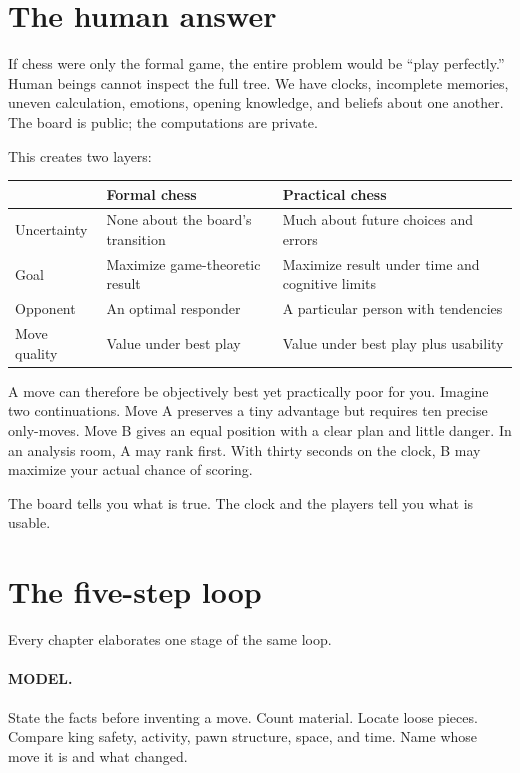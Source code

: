 \section{The human answer}
If chess were only the formal game, the entire problem would be ``play perfectly.'' Human beings cannot inspect the full tree. We have clocks, incomplete memories, uneven calculation, emotions, opening knowledge, and beliefs about one another. The board is public; the computations are private.

This creates two layers:

\begin{center}
\begin{tabularx}{.92\textwidth}{p{}YY}
\toprule
& \textbf{Formal chess} & \textbf{Practical chess}\\
\midrule
Uncertainty & None about the board's transition & Much about future choices and errors\\
Goal & Maximize game-theoretic result & Maximize result under time and cognitive limits\\
Opponent & An optimal responder & A particular person with tendencies\\
Move quality & Value under best play & Value under best play plus usability\\
\bottomrule
\end{tabularx}
\end{center}

A move can therefore be objectively best yet practically poor for you. Imagine two continuations. Move A preserves a tiny advantage but requires ten precise only-moves. Move B gives an equal position with a clear plan and little danger. In an analysis room, A may rank first. With thirty seconds on the clock, B may maximize your actual chance of scoring.

\begin{intuitionbox}
The board tells you what is true. The clock and the players tell you what is usable.
\end{intuitionbox}

\section{The five-step loop}
Every chapter elaborates one stage of the same loop.

\paragraph{MODEL.} State the facts before inventing a move. Count material. Locate loose pieces. Compare king safety, activity, pawn structure, space, and time. Name whose move it is and what changed.

